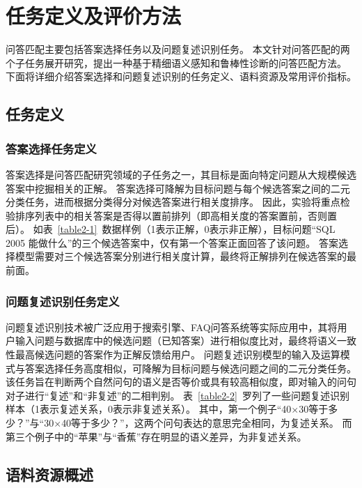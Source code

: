 \chapter{任务定义及评价方法}

问答匹配主要包括答案选择任务以及问题复述识别任务。
本文针对问答匹配的两个子任务展开研究，提出一种基于精细语义感知和鲁棒性诊断的问答匹配方法。
下面将详细介绍答案选择和问题复述识别的任务定义、语料资源及常用评价指标。

\section{任务定义}

\subsection{答案选择任务定义}

答案选择是问答匹配研究领域的子任务之一，其目标是面向特定问题从大规模候选答案中挖掘相关的正解。
答案选择可降解为目标问题与每个候选答案之间的二元分类任务，进而根据分类得分对候选答案进行相关度排序。
因此，实验将重点检验排序列表中的相关答案是否得以置前排列（即高相关度的答案置前，否则置后）。
如表~\ref{table2-1}~数据样例（1表示正解，0表示非正解），目标问题{\kai“SQL 2005 能做什么”}的三个候选答案中，仅有第一个答案正面回答了该问题。
答案选择模型需要对三个候选答案分别进行相关度计算，最终将正解排列在候选答案的最前面。



\subsection{问题复述识别任务定义}

问题复述识别技术被广泛应用于搜索引擎、FAQ问答系统等实际应用中，其将用户输入问题与数据库中的候选问题（已知答案）进行相似度比对，最终将语义一致性最高候选问题的答案作为正解反馈给用户。
问题复述识别模型的输入及运算模式与答案选择任务高度相似，可降解为目标问题与候选问题之间的二元分类任务。
该任务旨在判断两个自然问句的语义是否等价或具有较高相似度，即对输入的问句对子进行“复述”和“非复述”的二相判别。
表~\ref{table2-2}~罗列了一些问题复述识别样本（1表示复述关系，0表示非复述关系）。
其中，第一个例子{\kai“40$\times$30等于多少？”}与{\kai“30$\times$40等于多少？”}，这两个问句表达的意思完全相同，为复述关系。
而第三个例子中的{\kai“苹果”}与{\kai“香蕉”}存在明显的语义差异，为非复述关系。



\section{语料资源概述}
\label{2.2 语料资源概述}

